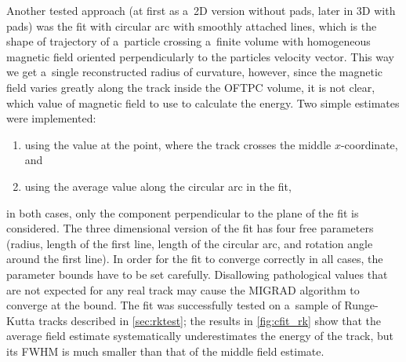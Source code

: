 		Another tested approach (at first as a~2D version without pads, later in 3D with pads) was the fit with circular arc with smoothly attached lines, which is the shape of trajectory of a~particle crossing a~finite volume with homogeneous magnetic field oriented perpendicularly to the particles velocity vector. This way we get a~single reconstructed radius of curvature, however, since the magnetic field varies greatly along the track inside the \ac{OFTPC} volume, it is not clear, which value of magnetic field to use to calculate the energy. Two simple estimates were implemented:
		\begin{enumerate}[nosep]
			\item using the value at the point, where the track crosses the middle $x$\nobreakdash-coordinate, and
			\item using the average value along the circular arc in the fit,
		\end{enumerate}
		in both cases, only the component perpendicular to the plane of the fit is considered. The three dimensional version of the fit has four free parameters (radius, length of the first line, length of the circular arc, and rotation angle around the first line). In order for the fit to converge correctly in all cases, the parameter bounds have to be set carefully. Disallowing pathological values that are not expected for any real track may cause the MIGRAD algorithm to converge at the bound. The fit was successfully tested on a~sample of Runge-Kutta tracks described in \cref{sec:rktest}; the results in \cref{fig:cfit_rk} show that the average field estimate systematically underestimates the energy of the track, but its \acs{FWHM} is much smaller than that of the middle field estimate.
	

